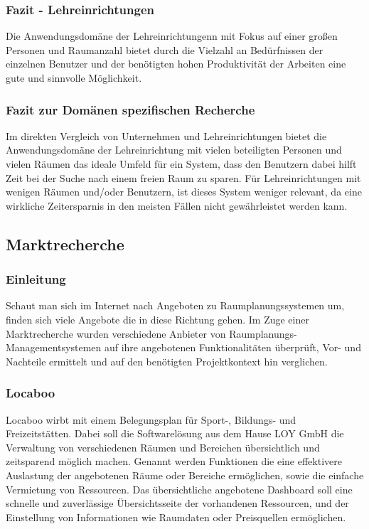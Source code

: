 \subsubsection{Fazit - Lehreinrichtungen}
\label{sec:Fazit_Lehreinrichtungen}

Die Anwendungsdomäne der Lehreinrichtungenn mit Fokus auf einer großen
Personen und Raumanzahl bietet durch die Vielzahl an Bedürfnissen der
einzelnen Benutzer und der benötigten hohen Produktivität der Arbeiten
eine gute und sinnvolle Möglichkeit.

\subsubsection{Fazit zur Domänen spezifischen Recherche}
\label{sec:Fazit_zur_Domänen_spezifischen_Recherche}

Im direkten Vergleich von Unternehmen und Lehreinrichtungen bietet die
Anwendungsdomäne der Lehreinrichtung mit vielen beteiligten Personen und vielen
Räumen das ideale Umfeld für ein System, dass den Benutzern dabei hilft Zeit
bei der Suche nach einem freien Raum zu sparen. Für Lehreinrichtungen mit
wenigen Räumen und/oder Benutzern, ist dieses System weniger relevant, da eine
wirkliche Zeitersparnis in den meisten Fällen nicht gewährleistet werden kann.


\subsection{Marktrecherche}
\label{sec:Marktrecherche}

\subsubsection{Einleitung}
\label{sec:Markt_recherheEinleitung}

Schaut man sich im Internet nach Angeboten zu Raumplanungssystemen um, finden
sich viele Angebote die in diese Richtung gehen. Im Zuge einer Marktrecherche
wurden verschiedene Anbieter von Raumplanungs-Managementsystemen auf ihre
angebotenen Funktionalitäten überprüft, Vor- und Nachteile ermittelt und auf
den benötigten Projektkontext hin verglichen.

\subsubsection{Locaboo}
\label{sec:Locaboo}

Locaboo \citep{locaboo} wirbt mit einem Belegungsplan für Sport-,
Bildungs- und Freizeitstätten. Dabei soll die Softwarelösung aus dem 
Hause LOY GmbH die Verwaltung von verschiedenen Räumen und Bereichen
übersichtlich und zeitsparend möglich machen. Genannt werden Funktionen die
eine effektivere Auslastung der angebotenen Räume oder Bereiche ermöglichen,
sowie die einfache Vermietung von Ressourcen. Das übersichtliche angebotene
Dashboard soll eine schnelle und zuverlässige Übersichtsseite der vorhandenen
Ressourcen, und der Einstellung von Informationen wie Raumdaten oder
Preisquellen ermöglichen.

